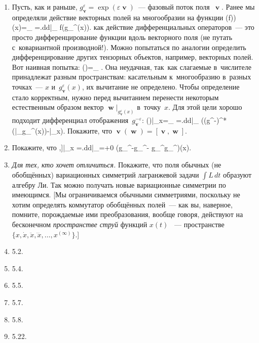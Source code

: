 \documentclass[a4paper,11pt]{article}
\def\[#1\]{\begin{align*}#1\end{align*}}
\theoremstyle{definition}
\begin{document}
\begin{enumerate}
\item
Пусть, как и раньше, $g_\mbfv^\varepsilon=\exp(\varepsilon\mbfv)$~— фазовый поток
поля~$\mbfv$. Ранее мы определяли действие векторных полей на многообразии на
функции
	\[
	(\mbfv(f))(x)=\lim_{\varepsilon{}}\varepsilon
		=\left.\frac d{d\varepsilon}\right|_{}
		f(g_\mbfv^\varepsilon(x)).
	\]
как действие дифференциальных операторов~— это просто дифференцирование функции
вдоль векторного поля (не путать с~ковариантной производной!).
Можно попытаться по аналогии определить дифференцирование других тензорных
объектов, например, векторных полей. Вот наивная попытка:
	\[
	\mbfv(\mbfw)=\lim_{\varepsilon{}}
		\varepsilon.
	\]
Она неудачная, так~как слагаемые в~числителе принадлежат разным
пространствам: касательным к~многообразию в~разных точках~— $x$
и~$g_\mbfv^\varepsilon(x)$, их вычитание не определено. Чтобы определение стало
корректным, нужно перед вычитанием перенести некоторым естественным образом
вектор $\mbfw|_{g_\mbfv^\varepsilon(x)}$ в~точку~$x$. Для этой цели хорошо
подходит дифференциал отображения~$g_\mbfv^{-\varepsilon}$:
	\[
	\mbfv(\mbfw)|_x=\lim_{\varepsilon{}}
		\varepsilon
		=\left.\frac d{d\varepsilon}\right|_{}
		\left((g^{-\varepsilon})^*(\mbfw|_{g_\mbfv^\varepsilon(x)})-\mbfw|_x\right).
	\]
Покажите, что $\mbfv(\mbfw)=[\mbfv,\mbfw]$.

\item
Покажите, что
	\[
	[\mbfv,\mbfw]|_x
		=\left.\frac d{d\varepsilon}\right|_{\varepsilon=+0}
		\left(g_\mbfw^{-\sqrt\varepsilon}\circ g_\mbfv^{-\sqrt\varepsilon}
		\circ g_\mbfw^{\sqrt\varepsilon}\circ g_\mbfv^{\sqrt\varepsilon}\right)(x).
	\]

\item
\emph{Для тех, кто хочет отличиться.} Покажите, что поля обычных (не
обобщённых) вариационных симметрий лагранжевой задачи $\int L\,dt$ образуют
алгебру Ли. Так можно получать новые вариационные симметрии по имеющимся. [Мы
ограничиваемся обычными симметриями, поскольку не хотим определять коммутатор
обобщённых полей~— как вы, наверное, помните, порождаемые ими преобразования,
вообще говоря, действуют на бесконечном \emph{пространстве струй\/} функций
$x(t)$ ~— пространстве $\{x,\dot x,\ddot x,\dddot x,\ldots,x^{(\infty)}\}$.]

\item
5.2.

\item
5.4.

\item
5.5.

\item
5.7.

\item
5.8.

\item
5.22.

\end{enumerate}
\end{document}
